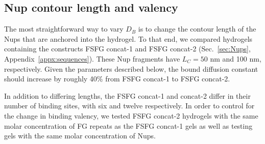 \subsection{Nup contour length and valency}

The most straightforward way to vary $D_B$ is to change the contour length of the Nups that are anchored into the hydrogel.  To that end, we compared hydrogels containing the constructs FSFG concat-1 and FSFG concat-2 (Sec.~\ref{sec:Nups}, Appendix~\ref{appx:sequences}).  These Nup fragments have $L_C = 50$ nm and 100 nm, respectively.  Given the parameters described below, the bound diffusion constant should increase by roughly 40\% from FSFG concat-1 to FSFG concat-2.

In addition to differing lengths, the FSFG concat-1 and concat-2 differ in their number of binding sites, with six and twelve respectively.  In order to control for the change in binding valency, we tested FSFG concat-2 hydrogels with the same molar concentration of FG repeats as the FSFG concat-1 gels as well as testing gels with the same molar concentration of Nups.

